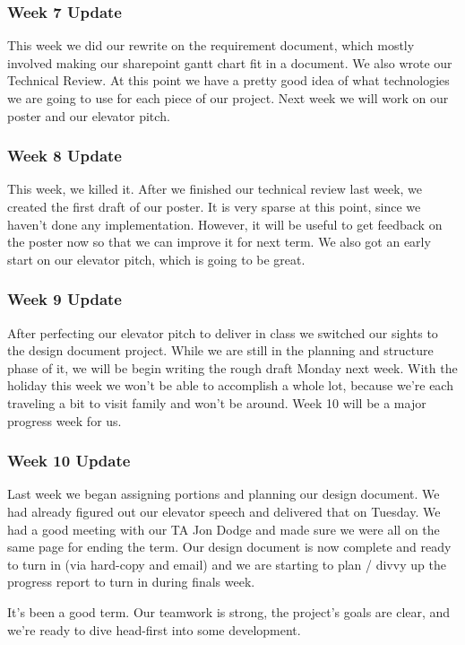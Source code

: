 \subsubsection{Week 7 Update}
​This week we did our rewrite on the requirement document, which mostly involved making our sharepoint gantt chart fit in a document. 
We also wrote our Technical Review. 
At this point we have a pretty good idea of what technologies we are going to use for each piece of our project.​​​ Next week we will work on our poster and our elevator pitch.

\subsubsection{Week 8 Update}
​This week, we killed it. 
After we finished our technical review last week, we created the first draft of our poster. 
It is very sparse at this point, since we haven't done any implementation. 
However, it will be useful to get feedback on the poster now so that we can improve it for next term. 
We also got an early start on our elevator pitch, which is going to be great.

\subsubsection{Week 9 Update}
After perfecting our elevator pitch to deliver in class we switched our sights to the design document project. 
While we are still in the planning and structure phase of it, we will be begin writing the rough draft Monday next week. 
With the holiday this week we won't be able to accomplish a whole lot, because we're each traveling a bit to visit family and won't be around. 
Week 10 will be a major progress week for us.

\subsubsection{Week 10 Update}
Last week we began assigning portions and planning our design document. 
We had already figured out our elevator speech and delivered that on Tuesday. 
We had a good meeting with our TA Jon Dodge and made sure we were all on the same page for ending the term. 
Our design document is now complete and ready to turn in (via hard-copy and email) and we are starting to plan / divvy up the progress report to turn in during finals week. 

It's been a good term. 
Our teamwork is strong, the project's goals are clear, and we're ready to dive head-first into some development. 


